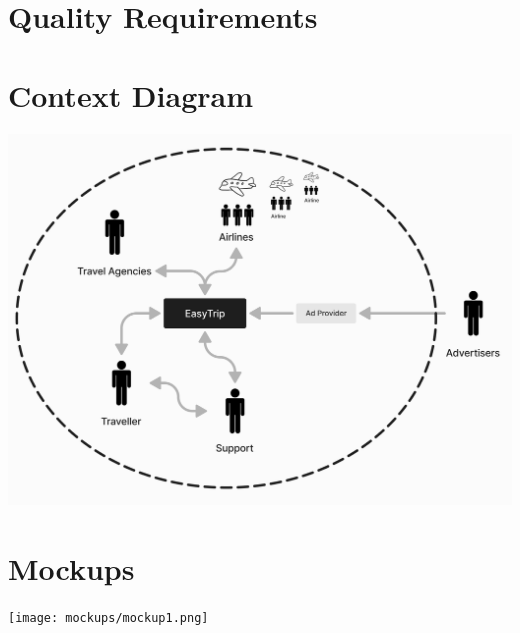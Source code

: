 \documentclass{article}
\begin{document}
\section{Quality Requirements}


\section{Context Diagram}
\includegraphics[width=.99\textwidth]{resources/contextDiagram.png}

\section{Mockups}
\texttt{[image: mockups/mockup1.png]}
\end{document}

